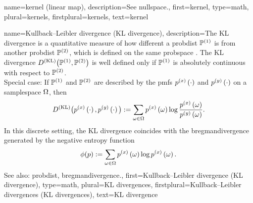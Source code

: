 {name={kernel (linear map)}, 
 	description={See \gls{nullspace}.},
 	first={kernel},
	type=math, 
	plural={kernels},
	firstplural={kernels},
	text={kernel} 
}

{name={Kullback–Leibler divergence (KL divergence)}, 
 	description={The KL divergence 
		is a quantitative \gls{measure} of how different a \gls{probdist} $\mathbb{P}^{(1)}$ is from another 
		\gls{probdist} $\mathbb{P}^{(2)}$, which is defined on the same \gls{probspace} \cite{coverthomas}. 
		The KL divergence $D^{(\rm KL)}\big( \mathbb{P}^{(1)},\mathbb{P}^{(2)} \big)$ 
		is well defined only if $\mathbb{P}^{(1)}$ is absolutely \gls{continuous} with respect to $\mathbb{P}^{(2)}$.\\
		Special case: If $\mathbb{P}^{(1)}$ 
		and $\mathbb{P}^{(2)}$ are described by the \glspl{pmf} $p^{(x)}\left(\cdot\right)$ and $p^{(y)}\left(\cdot\right)$ 
		on a \gls{samplespace} $\Omega$, then 
		\[
			D^{(\rm KL)}\big( p^{(x)}\left(\cdot\right),p^{(y)}\left(\cdot\right) \big) := \sum_{\omega \in \Omega} 
			p^{(x)}\left(\omega\right) \log \frac{p^{(x)}\left(\omega\right)}{p^{(y)}\left(\omega\right)}.
		\]
		In this discrete setting, the KL divergence coincides with the 
		\gls{bregmandivergence} generated by the negative \gls{entropy} \gls{function} \cite[Sec. 4.3]{CvxBubeck2015}
		\[
			\phi(p) := \sum_{\omega \in \Omega} 
			p^{(x)}\left(\omega\right) \log p^{(x)}\left(\omega\right).
		\]
		See also: \gls{probdist}, \gls{bregmandivergence}.},
 	first={Kullback–Leibler divergence (KL divergence)},
	type=math, 
	plural={KL divergences},
	firstplural={Kullback–Leibler divergences (KL divergences)},
	text={KL divergence} 
}

